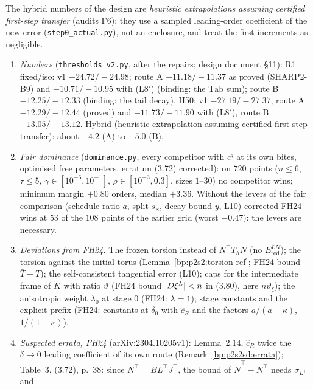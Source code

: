 The hybrid numbers of the design are \emph{heuristic extrapolations assuming certified first-step transfer} (audits F6): they use a sampled
leading-order coefficient of the new error (\texttt{step0\_actual.py}), not an enclosure, and treat the first increments as negligible.

\begin{remark}\label{bp:p2s2:register}
\begin{enumerate}[label=(\roman*)]
\item \emph{Numbers} (\texttt{thresholds\_v2.py}, after the repairs; design document \S11): R1 fixed/iso: v1 $-24.72/-24.98$; route A
  $-11.18/-11.37$ as proved (SHARP2-B9) and $-10.71/-10.95$ with (L8$'$) (binding: the $\mathrm{Tab}$ sum); route B $-12.25/-12.33$ (binding: the
  tail decay). H50: v1 $-27.19/-27.37$, route A $-12.29/-12.44$ (proved) and $-11.73/-11.90$ with (L8$'$), route B $-13.05/-13.12$. Hybrid
  (heuristic extrapolation assuming certified first-step transfer): about $-4.2$ (A) to $-5.0$ (B).
\item \emph{Fair dominance} (\texttt{dominance.py}, every competitor with $c^\natural$ at its own bites, optimised free parameters, erratum (3.72)
  corrected): on $720$ points ($n\le6$, $\tau\le5$, $\gamma\in[10^{-6},10^{-1}]$, $\rho\in[10^{-3},0.3]$, sizes $1$--$30$) no competitor wins; minimum margin
  $+0.80$ orders, median $+3.36$. Without the levers of the fair comparison (schedule ratio $a$, split $s_\varkappa$, decay bound $\bar y$, L10)
  corrected FH24 wins at $53$ of the $108$ points of the earlier grid (worst $-0.47$): the levers are necessary.
\item \emph{Deviations from FH24.} The frozen torsion instead of $N^\top T_hN$ (no $E^{LN}_{\mathrm{red}}$); the torsion against the initial torus
  (Lemma~\ref{bp:p2s2:torsion-ref}; FH24 bound $\bar T-T$); the self-consistent tangential error (L10); caps for the intermediate frame of $\tilde K$ with
  ratio $\vartheta$ (FH24 bound $\lvert D\xi^L\rvert<n$ in (3.80), here $n\vartheta_\xi$); the anisotropic weight $\lambda_0$ at stage $0$ (FH24: $\lambda=1$); stage constants and
  the explicit prefix (FH24: constants at $\delta_0$ with $\hat c_R$ and the factors $a/(a-\kappa)$, $1/(1-\kappa)$).
\item \emph{Suspected errata, FH24} (arXiv:2304.10205v1): Lemma~2.14, $\hat c_R$ twice the $\delta\to0$ leading coefficient of its own route
  (Remark~\ref{bp:p2s2sd:errata}); Table~3, (3.72), p.~38: since $N^\top=BL^\top J^\top$, the bound of $\bar{\bar N}^\top-N^\top$ needs $\sigma_{L^\top}$ and

\end{enumerate}
\end{remark}
